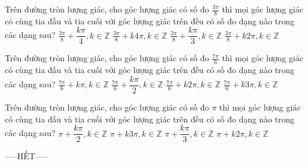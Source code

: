 \documentclass[12pt,a4paper]{article}
\begin{document}
\begin{ex}
 Trên đường tròn lượng giác, cho góc lượng giác có số đo ${\frac{3 \pi}{8}}$ thì mọi góc lượng giác có cùng tia đầu và tia cuối với góc lượng giác trên đều có số đo dạng nào trong các dạng sau? 
\choice
{ $\frac{3 \pi}{8}+\dfrac{k\pi }{4}, k\in \mathbb{Z}$ }
   { $\frac{3 \pi}{8}+k4\pi, k\in \mathbb{Z}$ }
     { $\frac{3 \pi}{8}+\dfrac{k\pi }{3}, k\in \mathbb{Z}$ }
    { \True $\frac{3 \pi}{8}+k2\pi, k\in \mathbb{Z}$ }
\end{ex}

\begin{ex}
 Trên đường tròn lượng giác, cho góc lượng giác có số đo ${\frac{7 \pi}{6}}$ thì mọi góc lượng giác có cùng tia đầu và tia cuối với góc lượng giác trên đều có số đo dạng nào trong các dạng sau? 
\choice
{ $\frac{7 \pi}{6}+k\pi, k\in \mathbb{Z}$ }
   { $\frac{7 \pi}{6}+\dfrac{k\pi }{2}, k\in \mathbb{Z}$ }
     { \True $\frac{7 \pi}{6}+k2\pi, k\in \mathbb{Z}$ }
    { $\frac{7 \pi}{6}+k3\pi, k\in \mathbb{Z}$ }
\end{ex}

\begin{ex}
 Trên đường tròn lượng giác, cho góc lượng giác có số đo ${\pi}$ thì mọi góc lượng giác có cùng tia đầu và tia cuối với góc lượng giác trên đều có số đo dạng nào trong các dạng sau? 
\choice
{ $\pi+\dfrac{k\pi }{2}, k\in \mathbb{Z}$ }
   { $\pi+k3\pi, k\in \mathbb{Z}$ }
     { $\pi+\dfrac{k\pi }{3}, k\in \mathbb{Z}$ }
    { \True $\pi+k2\pi, k\in \mathbb{Z}$ }
\end{ex}


 \begin{center}
-----HẾT-----
\end{center}

\end{document}
